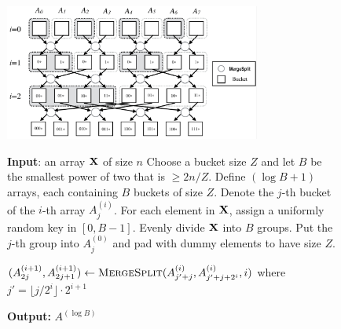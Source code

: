 \begin{figure}[h!]
\centering

\includegraphics[width=0.75\textwidth]{RadixBucketSort1.pdf}
\label{fig:radix-sort}

\bigskip
\begin{algorithm}
\begin{algorithmic}
\State
\State \textbf{Input}: an array $\mathbf{X}$ of size $n$
\State Choose a bucket size $Z$ and let $B$ be the smallest power of two that is $\geq 2n/Z$. 
\State Define $(\log B+1)$ arrays, each containing $B$ buckets of size $Z$. Denote the $j$-th bucket of the $i$-th array $A_j^{(i)}$.
\State For each element in $\mathbf{X}$, assign a uniformly random key in $[0,B-1]$.
\State Evenly divide $\mathbf{X}$ into $B$ groups. Put the $j$-th group into $A_j^{(0)}$ and pad with dummy elements to have size $Z$.

        \State $(A^{(i+1)}_{2j}, A^{(i+1)}_{2j+1}) \leftarrow \textsc{MergeSplit}(A^{(i)}_{j'+j}, A^{(i)}_{j'+j+2^i}, i)$ where $j'=\lfloor j / {2^i} \rfloor \cdot 2^{i+1}$
        \State {}
        
    \EndFor
\EndFor    
\State \textbf{Output:} $A^{(\log B)}$


\end{algorithmic}
\end{algorithm}
\end{figure}

